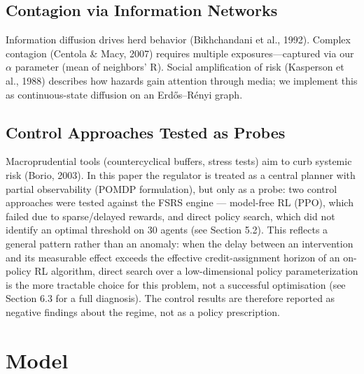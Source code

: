 \documentclass[11pt]{article}
\begin{document}
\subsection{Contagion via Information Networks}
Information diffusion drives herd behavior (Bikhchandani et al., 1992). Complex contagion (Centola \& Macy, 2007) requires multiple exposures---captured via our $\alpha$ parameter (mean of neighbors' R). Social amplification of risk (Kasperson et al., 1988) describes how hazards gain attention through media; we implement this as continuous-state diffusion on an Erdős--Rényi graph.

\subsection{Control Approaches Tested as Probes}
Macroprudential tools (countercyclical buffers, stress tests) aim to curb systemic risk (Borio, 2003). In this paper the regulator is treated as a central planner with partial observability (POMDP formulation), but only as a probe: two control approaches were tested against the FSRS engine --- model-free RL (PPO), which failed due to sparse/delayed rewards, and direct policy search, which did not identify an optimal threshold on 30 agents (see Section 5.2). This reflects a general pattern rather than an anomaly: when the delay between an intervention and its measurable effect exceeds the effective credit-assignment horizon of an on-policy RL algorithm, direct search over a low-dimensional policy parameterization is the more tractable choice for this problem, not a successful optimisation (see Section 6.3 for a full diagnosis). The control results are therefore reported as negative findings about the regime, not as a policy prescription.

\section{Model}
\end{document}
